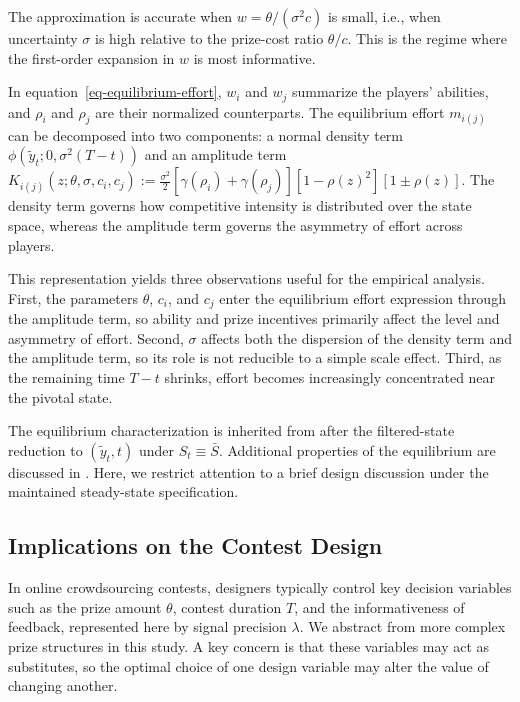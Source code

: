 \documentclass[mnsc]{informs3}
\begin{document}
\begin{remark}
The approximation is accurate when $w=\theta/(\sigma^2 c)$ is small, i.e., when uncertainty $\sigma$ is high relative to the prize-cost ratio $\theta/c$. This is the regime where the first-order expansion in $w$ is most informative.
\end{remark}

In equation~\eqref{eq-equilibrium-effort}, $w_i$ and $w_j$ summarize the players' abilities, and $\rho_i$ and $\rho_j$ are their normalized counterparts.
The equilibrium effort $m_{i(j)}$ can be decomposed into two components: a normal density term $\phi(\tilde{y}_t; 0, \sigma^2(T-t))$ and an amplitude term $K_{i(j)}(z;\theta,\sigma,c_i,c_j)
:= \frac{\sigma^2}{2}\left[\gamma(\rho_i)+\gamma(\rho_j)\right]\left[1-\rho(z)^2\right]\left[1\pm\rho(z)\right]$.
The density term governs how competitive intensity is distributed over the state space, whereas the amplitude term governs the asymmetry of effort across players.

This representation yields three observations useful for the empirical analysis.
First, the parameters $\theta$, $c_i$, and $c_j$ enter the equilibrium effort expression through the amplitude term, so ability and prize incentives primarily affect the level and asymmetry of effort.
Second, $\sigma$ affects both the dispersion of the density term and the amplitude term, so its role is not reducible to a simple scale effect.
Third, as the remaining time $T-t$ shrinks, effort becomes increasingly concentrated near the pivotal state.

The equilibrium characterization is inherited from \citet{Ryvkin2022Fight} after the filtered-state reduction to $(\tilde y_t,t)$ under $S_t\equiv\bar S$.
Additional properties of the equilibrium are discussed in \citet{Ryvkin2022Fight}.
Here, we restrict attention to a brief design discussion under the maintained steady-state specification.



\subsection{Implications on the Contest Design}\label{sect-design}

In online crowdsourcing contests, designers typically control key decision variables such as the prize amount $\theta$, contest duration $T$, and the informativeness of feedback, represented here by signal precision $\lambda$.
We abstract from more complex prize structures in this study.
A key concern is that these variables may act as substitutes, so the optimal choice of one design variable may alter the value of changing another.
\end{document}
